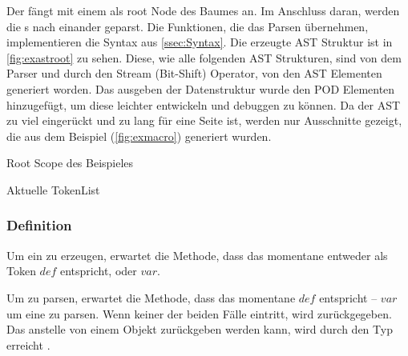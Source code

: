     Der  fängt mit einem  als root Node des Baumes an. Im Anschluss daran, werden die s nach einander geparst. Die Funktionen, die das Parsen übernehmen, implementieren die Syntax aus \autoref{ssec:Syntax}. Die erzeugte AST Struktur ist in \autoref{fig:exastroot} zu sehen. Diese, wie alle folgenden AST Strukturen, sind von dem Parser und durch den Stream (Bit-Shift) Operator, von den AST Elementen generiert worden. Das ausgeben der Datenstruktur wurde den POD Elementen hinzugefügt, um diese leichter entwickeln und debuggen zu können. Da der AST zu viel eingerückt und zu lang für eine Seite ist, werden nur Ausschnitte gezeigt, die aus dem Beispiel (\autoref{fig:exmacro}) generiert wurden.
    \begin{paracol}{2}
      \begin{myCodeEnv}
        \centering
        \begin{myInvBox}[width=.9\linewidth]
          
        \end{myInvBox}
        \caption{Root Scope des Beispieles}
        \label{fig:exastroot}
      \end{myCodeEnv}
      \switchcolumn
      \begin{myCodeEnv}
        \centering
        \begin{myInvBox}[width=.9\linewidth]
          
        \end{myInvBox}
        \caption*{Aktuelle TokenList}
      \end{myCodeEnv}
    \end{paracol}

    \subsubsection{Definition}
    \label{sssec:Definition}
      Um ein  zu erzeugen, erwartet die  Methode, dass das momentane  entweder als Token \myRIn$def$ entspricht, oder \myRIn$var$.

      Um  zu parsen, erwartet die Methode, dass das momentane  \myRIn$def$ entspricht -- \myRIn$var$ um eine  zu parsen. Wenn keiner der beiden Fälle eintritt, wird  zurückgegeben. Das  anstelle von einem  Objekt zurückgeben werden kann, wird durch den  Typ erreicht \autocite{cpp-fundamentals}.


